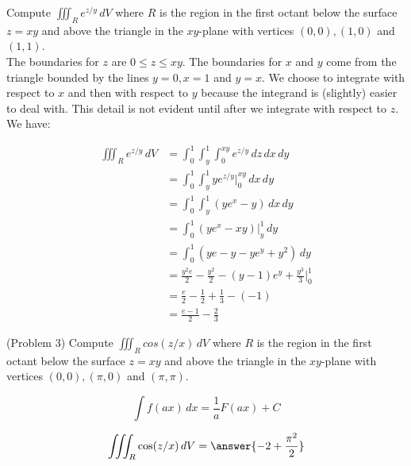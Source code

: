 \documentclass[handout]{ximera}
\begin{document}
\begin{example}[Example 3]
Compute $\iiint_R  e^{z/y} \, dV$ where $R$ is the region in the first octant below the 
surface $z = xy$ and above the triangle in the $xy$-plane with vertices $(0,0), (1,0)$ and $(1,1)$.\\


The boundaries for $z$ are $0 \leq z \leq xy$. The boundaries for $x$ and $y$ come from the triangle bounded by the lines
$y = 0, x = 1$ and $y = x$.  We choose to integrate with respect to $x$ and then with respect to $y$ because the
integrand is (slightly) easier to deal with.  This detail is not evident until after we integrate with respect to $z$.
We have:

\begin{align*}
\iiint_R e^{z/y} \, dV & = \int_0^1 \int_y^1 \int_0^{xy} e^{z/y} \, dz \, dx \, dy\\
                 & = \int_0^1 \int_y^1 ye^{z/y}\bigg|_{0}^{xy} \,dx \, dy\\
                 & = \int_0^1 \int_y^1 \left(ye^x - y\right) \,dx \, dy\\
                 &= \int_0^1 \left(ye^x - xy\right) \bigg|_y^1 \, dy\\
                 &= \int_0^1 \left(ye - y - ye^y + y^2\right) \, dy\\
                 &= \frac{y^2 e}{2} - \frac{y^2}{2} - (y-1)e^y + \frac{y^3}{3} \bigg|_0^1\\
                 &= \frac{e}{2} - \frac12 + \frac13 - (-1)\\
                 &= \frac{e-1}{2} - \frac23
\end{align*} 

\end{example}

\begin{problem}(Problem 3)
Compute $\iiint_R  cos(z/x) \, dV$ where $R$ is the region in the first octant below the 
surface $z = xy$ and above the triangle in the $xy$-plane with vertices $(0,0), (\pi, 0)$ and $(\pi, \pi)$.\\
\begin{hint}
\[
\int f(ax) \, dx = \frac{1}{a} F(ax) + C
\]
\end{hint}
\[
\iiint_R  \cos(z/x) \, dV = \answer{-2 +\frac{\pi^2}{2}}
\]

\end{problem}
\end{document}

